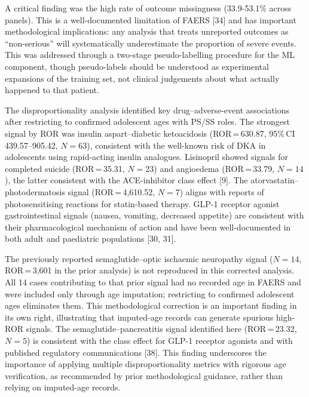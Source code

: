 \documentclass[10pt,a4paper]{article}
\begin{document}
A critical finding was the high rate of outcome missingness (33.9-53.1\% across panels). This is a well-documented limitation of FAERS [34] and has important methodological implications: any analysis that treats unreported outcomes as ``non-serious'' will systematically underestimate the proportion of severe events. This was addressed through a two-stage pseudo-labelling procedure for the ML component, though pseudo-labels should be understood as experimental expansions of the training set, not clinical judgements about what actually happened to that patient.

The disproportionality analysis identified key drug--adverse-event associations after restricting to confirmed adolescent ages with PS/SS roles. The strongest signal by ROR was insulin aspart--diabetic ketoacidosis (ROR\,=\,630.87, 95\%\,CI 439.57--905.42, $N=63$), consistent with the well-known risk of DKA in adolescents using rapid-acting insulin analogues. Lisinopril showed signals for completed suicide (ROR\,=\,35.31, $N=23$) and angioedema (ROR\,=\,33.79, $N=14$), the latter consistent with the ACE-inhibitor class effect [9]. The atorvastatin--photodermatosis signal (ROR\,=\,4{,}610.52, $N=7$) aligns with reports of photosensitising reactions for statin-based therapy. GLP-1 receptor agonist gastrointestinal signals (nausea, vomiting, decreased appetite) are consistent with their pharmacological mechanism of action and have been well-documented in both adult and paediatric populations [30, 31].

The previously reported semaglutide--optic ischaemic neuropathy signal ($N=14$, ROR\,=\,3,601 in the prior analysis) is not reproduced in this corrected analysis. All 14 cases contributing to that prior signal had no recorded age in FAERS and were included only through age imputation; restricting to confirmed adolescent ages eliminates them. This methodological correction is an important finding in its own right, illustrating that imputed-age records can generate spurious high-ROR signals. The semaglutide--pancreatitis signal identified here (ROR\,=\,23.32, $N=5$) is consistent with the class effect for GLP-1 receptor agonists and with published regulatory communications [38]. This finding underscores the importance of applying multiple disproportionality metrics with rigorous age verification, as recommended by prior methodological guidance, rather than relying on imputed-age records.
\end{document}
